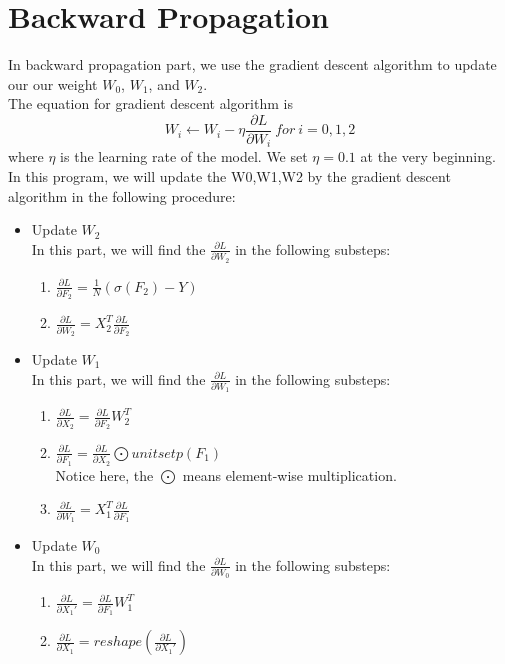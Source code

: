 \documentclass[12pt]{article}
\begin{document}
	\section*{Backward Propagation}
		In backward propagation part, we use the gradient descent algorithm to update our our weight $W_0$, $W_1$, and $W_2$.\\
		The equation for gradient descent algorithm is
		$$W_i \leftarrow W_i - \eta \frac{\partial L}{\partial W_i} \ for \ i = 0, 1, 2$$
		where $\eta$ is the learning rate of the model. We set $\eta = 0.1$ at the very beginning.\\
		In this program, we will update the W0,W1,W2 by the gradient descent algorithm in the following procedure:
		\begin{itemize}
			\item Update $W_2$ \\
			In this part, we will find the $\frac{\partial L}{\partial W_2}$ in the following substeps:
			\begin{enumerate}
				\item $\frac{\partial L}{\partial F_2} = \frac{1}{N} (\sigma(F_2) - Y)$
				\item $\frac{\partial L}{\partial W_2} = X_2^T \frac{\partial L}{\partial F_2}$
			\end{enumerate}
			\item Update $W_1$ \\
			In this part, we will find the $\frac{\partial L}{\partial W_1}$ in the following substeps:
			\begin{enumerate}
				\item $\frac{\partial L}{\partial X_2} = \frac{\partial L}{\partial F_2} W_2^T$
				\item $\frac{\partial L}{\partial F_1} = \frac{\partial L}{\partial X_2} \bigodot unitsetp(F_1)$ \\
				[0.12in]
				Notice here, the $\bigodot$ means element-wise multiplication.
				\item $\frac{\partial L}{\partial W_1} = X_1^T \frac{\partial L}{\partial F_1}$
			\end{enumerate}
			\item Update $W_0$ \\
			In this part, we will find the $\frac{\partial L}{\partial W_0}$ in the following substeps:
			\begin{enumerate}
				\item $\frac{\partial L}{\partial X_1'} = \frac{\partial L}{\partial F_1} W_1^T$
				\item $\frac{\partial L}{\partial X_1} = reshape(\frac{\partial L}{\partial X_1'})$ \\

\end{enumerate}
\end{itemize}
\end{document}
